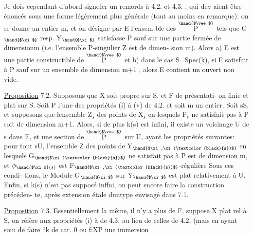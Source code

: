 
Je dois cependant d'abord signqler un remords à 4.2. et 4.3. , qui
dev-aient être énoncés sous une forme légèrement plus générale (tout au
moins en remarque): on se donne un entier m, et on désigne par E l'ensem
ble des \hand{$\xi\in$}$\overset{\hand{$\vee$}}{\text{P}}$ tels que G$_{\hand{$\xi$}}$ resp. Y$_{\hand{$\xi$}}$ satisfasse P sauf  sur une
partie fermée de dimension\hand{$\leq$}m (i.e. l'ensemble P-singulier Z est de dimen-%
sion\hand{$\leq$} m). Alors a) E est une partie constructible de $\overset{\hand{$\vee$}}{\text{P}}$ et b) dans le
cas S=Spec(k), si F  satisfait à P sauf  sur un ensemble de
dimension\hand{$\leq$} m+1 , alors E contient un ouvert non vide.

\uline{Proposition} 7.2. Supposons que X soit propre sur S, et F de présentati-%
on finie et plat sur S. Soit P l'une des propriétés (i) à (v) de 4.2.
et soit m un entier. Soit s\hand{$\in$}S, et supposons que 
 lensemble Z$_s$ des points de X$_s$ en lesquels F$_s$ ne satisfait
pas à P soit de dimension \hand{$\leq$} m+1. Alors, si de plus k(s) est infini, il
existe un voisinage U de s dans E, et une section \hand{$\xi$} de $\overset{\hand{$\vee$}}{\text{P}}$ sur U, ayant
les propriétés suivantes: pour tout s\hand{$\in$}U, l'ensemble Z des points
de  Y$_{\hand{$\xi,\xi(\textcolor{black}{s})$}}$ en lesquels G$_{\hand{$\xi(\textcolor{black}{s})$}}$ ne satisfait pas à P est de dimension
\hand{$\leq$}m, et $\phi_{\hand{$\xi$}(s)}$ est F$_{\hand{$\xi,\xi(\textcolor{black}{s})$}}$-régulière\hand{,}  Sous ces condi-%
tions, le Module G$_{\hand{$\xi$}}$ sur Y$_{\hand{$\xi$}}$ est plat relativement à U. Enfin, si k(s)
n'est pas supposé inffni, on peut encore faire la construction précéden-%
te, après extension étale duntype envisagé dans 7.1.

\uline{Proposition} 7.3. Essentiellement la même, il n'y a plus de F, 
suppose X plat rel à S, on réfère aux propriétés (i) à  de 4.3. au
lieu de celles de 4.2. (mais en ayant soin de faire  
``k de car. 0 ou f:X\hand{$\longrightarrow$}P une immersion\hand{\unsure{$\xi$}}

